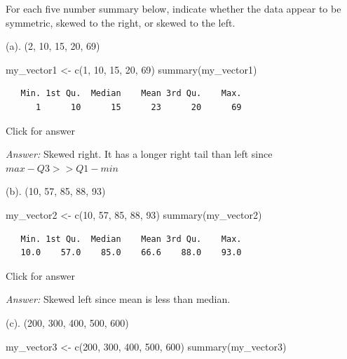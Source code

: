 \documentclass[
]{book}
\newenvironment{Shaded}{\begin{snugshade}}{\end{snugshade}}
\newcommand{\DecValTok}[1]{\textcolor[rgb]{0.00,0.00,0.81}{#1}}
\newcommand{\FunctionTok}[1]{\textcolor[rgb]{0.00,0.00,0.00}{#1}}
\newcommand{\NormalTok}[1]{#1}
\newcommand{\OtherTok}[1]{\textcolor[rgb]{0.56,0.35,0.01}{#1}}
\begin{document}
For each five number summary below, indicate whether the data appear to be symmetric, skewed to the right, or skewed to the left.

(a). (2, 10, 15, 20, 69)

\begin{Shaded}
\begin{Highlighting}[]
\NormalTok{my\_vector1 }\OtherTok{\textless{}{-}} \FunctionTok{c}\NormalTok{(}\DecValTok{1}\NormalTok{, }\DecValTok{10}\NormalTok{, }\DecValTok{15}\NormalTok{, }\DecValTok{20}\NormalTok{, }\DecValTok{69}\NormalTok{)}
\FunctionTok{summary}\NormalTok{(my\_vector1)}
\end{Highlighting}
\end{Shaded}

\begin{verbatim}
   Min. 1st Qu.  Median    Mean 3rd Qu.    Max. 
      1      10      15      23      20      69 
\end{verbatim}

Click for answer

\emph{Answer:} Skewed right. It has a longer right tail than left since \(max - Q3 >> Q1 - min\)

(b). (10, 57, 85, 88, 93)

\begin{Shaded}
\begin{Highlighting}[]
\NormalTok{my\_vector2 }\OtherTok{\textless{}{-}} \FunctionTok{c}\NormalTok{(}\DecValTok{10}\NormalTok{, }\DecValTok{57}\NormalTok{, }\DecValTok{85}\NormalTok{, }\DecValTok{88}\NormalTok{, }\DecValTok{93}\NormalTok{)}
\FunctionTok{summary}\NormalTok{(my\_vector2)}
\end{Highlighting}
\end{Shaded}

\begin{verbatim}
   Min. 1st Qu.  Median    Mean 3rd Qu.    Max. 
   10.0    57.0    85.0    66.6    88.0    93.0 
\end{verbatim}

Click for answer

\emph{Answer:} Skewed left since mean is less than median.

(c). (200, 300, 400, 500, 600)

\begin{Shaded}
\begin{Highlighting}[]
\NormalTok{my\_vector3 }\OtherTok{\textless{}{-}} \FunctionTok{c}\NormalTok{(}\DecValTok{200}\NormalTok{, }\DecValTok{300}\NormalTok{, }\DecValTok{400}\NormalTok{, }\DecValTok{500}\NormalTok{, }\DecValTok{600}\NormalTok{)}
\FunctionTok{summary}\NormalTok{(my\_vector3)}
\end{Highlighting}
\end{Shaded}
\end{document}

